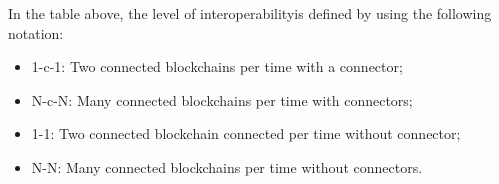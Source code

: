 
 

\noindent In the table above, the level of interoperability\footnotemark[1] is defined by using the following notation:
\begin{itemize}
    \item 1-c-1: Two connected blockchains per time with a connector;
    \item N-c-N: Many connected blockchains per time with connectors;
    \item 1-1: Two connected blockchain connected per time without connector;
    \item N-N: Many connected blockchains per time without connectors.
\end{itemize}







